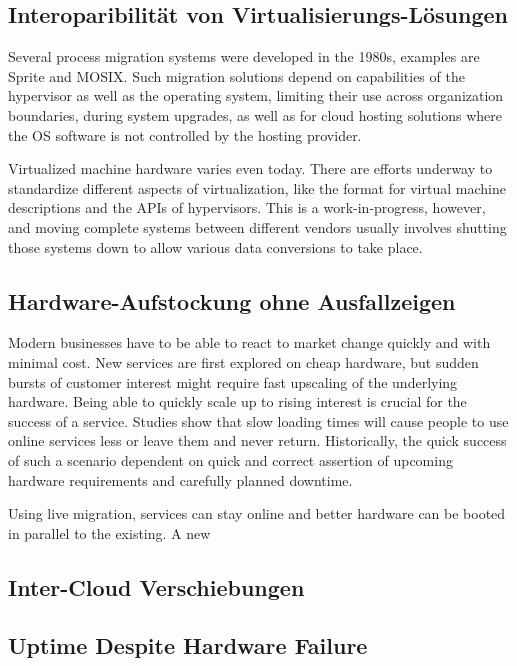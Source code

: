 \documentclass[draft,journal]{IEEEtran}
\begin{document}
\subsection{Interoparibilität von Virtualisierungs-Lösungen}
Several process migration systems were developed in the 1980s,
examples are Sprite and MOSIX\cite{hansen2004self}. Such migration
solutions depend on capabilities of the hypervisor as well as the
operating system, limiting their use across organization boundaries,
during system upgrades, as well as for cloud hosting solutions where
the OS software is not controlled by the hosting provider.

Virtualized machine hardware varies even today. There are efforts
underway\cite{cloudstandard} to standardize different aspects of
virtualization, like the format for virtual machine descriptions and
the APIs of hypervisors. This is a work-in-progress, however, and
moving complete systems between different vendors usually involves
shutting those systems down to allow various data conversions to take
place.

\subsection{Hardware-Aufstockung ohne Ausfallzeigen}
Modern businesses have to be able to react to market change quickly
and with minimal cost. New services are first explored on cheap
hardware\cite{tanenbaum1992modern}, but sudden bursts of customer
interest might require fast upscaling of the underlying
hardware. Being able to quickly scale up to rising interest is crucial
for the success of a service. Studies show that slow loading times
will cause people to use online services less or leave them and never
return\cite{kohavi2007online}. Historically, the quick success of such
a scenario dependent on quick and correct assertion of upcoming
hardware requirements and carefully planned downtime.

Using live migration, services can stay online and better hardware can
be booted in parallel to the existing. A new 

\subsection{Inter-Cloud Verschiebungen}
\label{sec:movclouds}
\subsection{Uptime Despite Hardware Failure}
\label{sec:hardfail}
\end{document}
